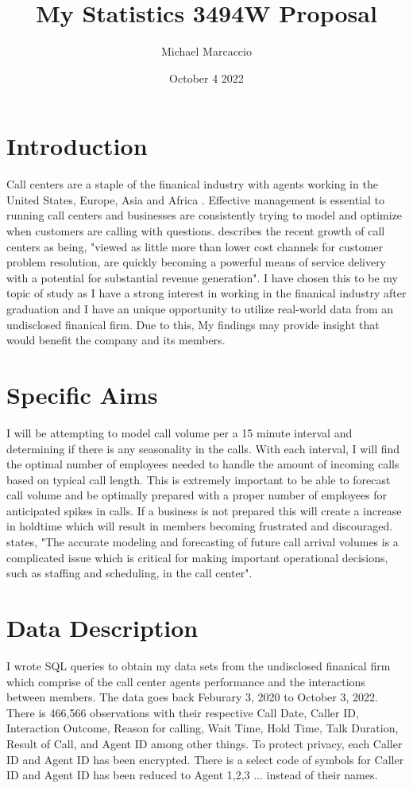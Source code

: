 \documentclass[12pt]{article}
\title{My Statistics 3494W Proposal}
\author{Michael  Marcaccio}
\date{October 4 2022}
\begin{document}
\maketitle

\section*{Introduction}
Call centers are a staple of the finanical industry with agents working in the United States, Europe, Asia and Africa \citep{ibrahim2016modeling}. 
Effective management is essential to running call centers and businesses are consistently trying to model and optimize when customers are calling with questions. 
\citet*{evensen1999effective} describes the recent growth of call centers as being, "viewed as little more than lower cost channels for customer
problem resolution, are quickly becoming a powerful means of service delivery with a potential for substantial revenue generation".
I have chosen this to be my topic of study as I have a strong interest in working in the finanical industry after graduation and I have an unique opportunity to utilize real-world data from an undisclosed
finanical firm. Due to this, My findings may provide insight that would benefit the company and its members.

\section*{Specific Aims}
I will be attempting to model call volume per a 15 minute interval and determining if there is any seasonality in the calls. With each interval,
I will find the optimal number of employees needed to handle the amount of incoming calls based on typical call length. This is extremely important
to be able to forecast call volume and be optimally prepared with a proper number of employees for anticipated spikes in calls. If a business is not prepared
this will create a increase in holdtime which will result in members becoming frustrated and discouraged. \citet*{ibrahim2016modeling} states, "The accurate modeling and forecasting of future call arrival volumes is a 
complicated issue which is critical for making important operational decisions, such as staffing and scheduling, in the call center".
    
\section*{Data Description}
I wrote SQL queries to obtain my data sets from the undisclosed finanical firm which comprise of the call center agents performance and the interactions between members. 
The data goes back Feburary 3, 2020 to October 3, 2022. There is 466,566 observations with their respective Call Date, Caller ID, Interaction Outcome,
Reason for calling, Wait Time, Hold Time, Talk Duration, Result of Call, and Agent ID among other things. To protect privacy, each Caller ID
and Agent ID has been encrypted. There is a select code of symbols for Caller ID and Agent ID has been reduced to Agent 1,2,3 ... instead of 
their names.
\end{document}
